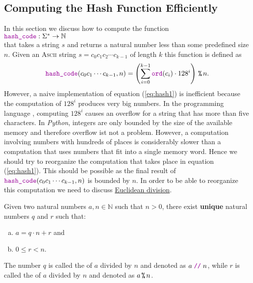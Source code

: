 \subsection{Computing the Hash Function Efficiently}
In this section we discuss how to compute the function 
\\[0.2cm]
\hspace*{1.3cm}
$\mytt{hash\_code}:\Sigma^* \rightarrow \mathbb{N}$
\\[0.2cm]
that takes a string $s$ and returns a natural number less than some predefined size $n$.
Given an \textsc{Ascii} string $s = c_0 c_1 c_2 \cdots c_{k-1}$ of length $k$ this function is defined as
\begin{equation}
  \mytt{hash\_code}(c_0c_1\cdots c_{k-1}, n) = \left(\sum\limits_{i=0}^{k-1} \mytt{ord}(c_i) \cdot 128^i\right) \mmod n.
  \label{eq:hash1}
\end{equation}
However, a naive implementation of equation (\ref{eq:hash1}) is inefficient because the computation of $128^i$
produces very big numbers.  In the programming language , computing $128^i$ causes an overflow for a
string that has more than five characters.  In \textsl{Python}, integers are only bounded by the size of the
available memory and therefore overflow ist not a problem.  However, a computation
involving numbers with hundreds of places is considerably slower than a computation that uses numbers that fit
into a single memory word. Hence we should try to reorganize the computation that takes place in equation
(\ref{eq:hash1}).  This should be possible as the final result of $\mytt{hash\_code}(c_0c_1\cdots c_{k-1}, n)$
is bounded by $n$.  In order to be able to reorganize this computation we need to discuss
\href{https://en.wikipedia.org/wiki/Euclidean_division}{Euclidean division}.

\begin{Theorem}
  Given two natural numbers $a, n \in \mathbb{N}$ such that $n > 0$, there exist \textbf{unique} natural numbers 
  $q$ and $r$ such that:
  \begin{enumerate}[(a)]
  \item $a = q \cdot n + r$ \quad and
  \item $0 \leq r < n$.
  \end{enumerate}
  The number $q$ is called the  of $a$ divided by $n$ and denoted as $a \;\mytt{//}\; n$, while
  $r$ is called the  of $a$ divided by $n$ and denoted as $a \,\texttt{\%}\, n$.  \eox
\end{Theorem}

